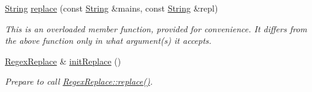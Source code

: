 \begin{DoxyCompactItemize}
\hyperlink{namespacejpcre2_a91f03070152fb228bc116c5a737f1d16}{String} \hyperlink{classjpcre2_1_1Regex_addd7c21abd0f4cf6c532a7602cfb5835}{replace} (const \hyperlink{namespacejpcre2_a91f03070152fb228bc116c5a737f1d16}{String} \&mains, const \hyperlink{namespacejpcre2_a91f03070152fb228bc116c5a737f1d16}{String} \&repl)
\begin{DoxyCompactList}\small\item\em This is an overloaded member function, provided for convenience. It differs from the above function only in what argument(s) it accepts. \end{DoxyCompactList}\item 
\hyperlink{classjpcre2_1_1RegexReplace}{Regex\+Replace} \& \hyperlink{classjpcre2_1_1Regex_ae7235a991492fa88f1bd3fb02d59cd0a}{init\+Replace} ()
\begin{DoxyCompactList}\small\item\em Prepare to call \hyperlink{classjpcre2_1_1RegexReplace_afd087fa7a9bfedec802d1a3dd7edbdd0}{Regex\+Replace\+::replace()}. \end{DoxyCompactList}\end{DoxyCompactItemize}
